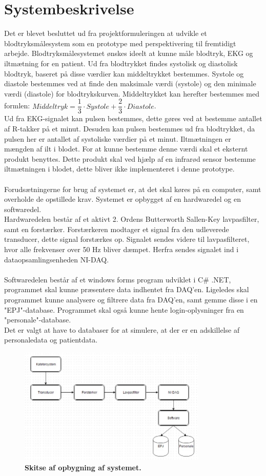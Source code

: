 \chapter{Systembeskrivelse}
Det er blevet besluttet ud fra projektformuleringen at udvikle et blodtryksmålesystem som en prototype med perspektivering til fremtidigt arbejde. Blodtryksmålesystemet ønskes ideelt at kunne måle blodtryk, EKG og iltmætning for en patient. Ud fra blodtrykket findes systolisk og diastolisk blodtryk, baseret på disse værdier kan middeltrykket bestemmes. Systole og diastole bestemmes ved at finde den maksimale værdi (systole) og den minimale værdi (diastole) for blodtrykskurven. Middeltrykket kan herefter bestemmes med formlen: $Middeltryk = \dfrac{1}{3} \cdot Systole + \dfrac{2}{3} \cdot Diastole$. \cite{blodtrykwiki}
\\ Ud fra EKG-signalet kan pulsen bestemmes, dette gøres ved at bestemme antallet af R-takker på et minut. Desuden kan pulsen bestemmes ud fra blodtrykket, da pulsen her er antallet af systoliske værdier på et minut. Iltmætningen er mængden af ilt i blodet. For at kunne bestemme denne værdi skal et eksternt produkt benyttes. Dette produkt skal ved hjælp af en infrarød sensor bestemme iltmætningen i blodet, dette bliver ikke implementeret i denne prototype.\\\\
Forudsætningerne for brug af systemet er, at det skal køres på en computer, samt overholde de opstillede krav. Systemet er opbygget af en hardwaredel og en softwaredel. \\
Hardwaredelen består af et aktivt 2. Ordens Butterworth Sallen-Key lavpasfilter, samt en forstærker. Forstærkeren modtager et signal fra den udleverede transducer, dette signal forstærkes op. Signalet sendes videre til lavpasfilteret, hvor alle frekvenser over 50 Hz bliver dæmpet. Herfra sendes signalet ind i dataopsamlingsenheden NI-DAQ.\\\\
Softwaredelen består af et windows forms program udviklet i C\# .NET, programmet skal kunne præsentere data indhentet fra DAQ’en. Ligeledes skal programmet kunne analysere og filtrere data fra DAQ’en, samt gemme disse i en "EPJ"-database. Programmet skal også kunne hente login-oplysninger fra en "personale"-database. \\
Det er valgt at have to databaser for at simulere, at der er en adskillelse af personaledata og patientdata.
\begin{figure}[H]
\includegraphics[width =0.8\textwidth , center]{billeder/system}
\caption{\textbf{Skitse af opbygning af systemet.}}
\end{figure}
